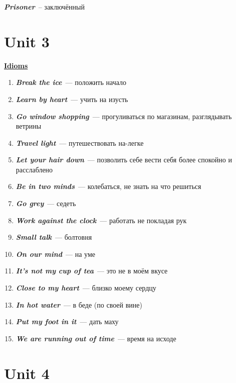 \documentclass[10pt,a4paper]{article}
\begin{document}
\textit{\textbf{Prisoner}}~-- заключённый





\section{Unit 3}
\textbf{\underline{Idioms}}

\begin{enumerate}
  \item \textit{\textbf{Break the ice}}~--- положить начало 
  \item \textit{\textbf{Learn by heart}}~--- учить на изусть
  \item \textit{\textbf{Go window shopping}}~--- прогуливаться по магазинам, разглядывать ветрины
  \item \textit{\textbf{Travel light}}~--- путешествовать на-легке
  \item \textit{\textbf{Let your hair down}}~--- позволить себе вести себя более спокойно и расслаблено
  \item \textit{\textbf{Be in two minds}}~--- колебаться, не знать на что решиться
  \item \textit{\textbf{Go grey}}~--- седеть
  \item \textit{\textbf{Work against the clock}}~--- работать не покладая рук
  \item \textit{\textbf{Small talk}}~--- болтовня
  \item \textit{\textbf{On our mind}}~--- на уме
  \item \textit{\textbf{It's not my cup of tea}}~--- это не в моём вкусе
  \item \textit{\textbf{Close to my heart}}~--- близко моему сердцу
  \item \textit{\textbf{In hot water}}~--- в беде (по своей вине)
  \item \textit{\textbf{Put my foot in it}}~--- дать маху
  \item \textit{\textbf{We are running out of time}}~--- время на исходе
\end{enumerate}

 
 


\section{Unit 4}
\end{document}
